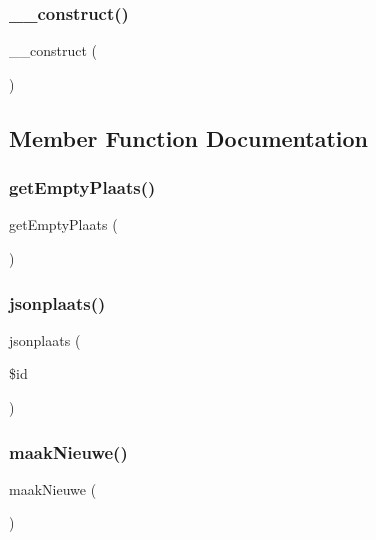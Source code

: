 \subsubsection{\texorpdfstring{\+\_\+\+\_\+construct()}{\_\_construct()}}
{\footnotesize\ttfamily \+\_\+\+\_\+construct (\begin{DoxyParamCaption}{ }\end{DoxyParamCaption})}



\subsection{Member Function Documentation}
\mbox{\label{class_plaats_a3a5c8647f1efcdff577c49894a2bdde8}} 
\subsubsection{\texorpdfstring{get\+Empty\+Plaats()}{getEmptyPlaats()}}
{\footnotesize\ttfamily get\+Empty\+Plaats (\begin{DoxyParamCaption}{ }\end{DoxyParamCaption})}

\mbox{\label{class_plaats_aeac29d4165c8a50a862fe3e8df220376}} 
\subsubsection{\texorpdfstring{jsonplaats()}{jsonplaats()}}
{\footnotesize\ttfamily jsonplaats (\begin{DoxyParamCaption}\item[{}]{\$id }\end{DoxyParamCaption})}

\mbox{\label{class_plaats_a7e7e04e0718668180cf4e8fb0b4dea9b}} 
\subsubsection{\texorpdfstring{maak\+Nieuwe()}{maakNieuwe()}}
{\footnotesize\ttfamily maak\+Nieuwe (\begin{DoxyParamCaption}{ }\end{DoxyParamCaption})}

